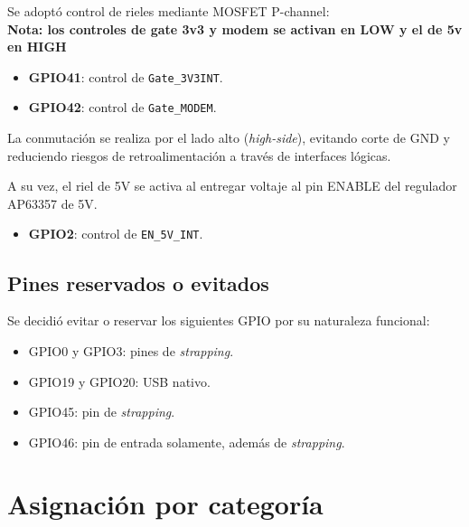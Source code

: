 \documentclass[9pt,a4paper,twocolumn,twoside]{rho-class/rho}
\begin{document}
Se adoptó control de rieles mediante MOSFET P-channel:\\
\textbf{Nota: los controles de gate 3v3 y modem se activan en LOW y el de 5v en HIGH}
\begin{itemize}
    \item \textbf{GPIO41}: control de \texttt{Gate\_3V3INT}.
    \item \textbf{GPIO42}: control de \texttt{Gate\_MODEM}.
\end{itemize}

La conmutación se realiza por el lado alto (\textit{high-side}), evitando corte de GND y reduciendo riesgos de retroalimentación a través de interfaces lógicas.

A su vez, el riel de 5V se activa al entregar voltaje al pin ENABLE del regulador AP63357 de 5V.
\begin{itemize}
    \item \textbf{GPIO2}: control de \texttt{EN\_5V\_INT}.
\end{itemize}


\subsection{Pines reservados o evitados}

Se decidió evitar o reservar los siguientes GPIO por su naturaleza funcional:

\begin{itemize}
    \item GPIO0 y GPIO3: pines de \textit{strapping}.
    \item GPIO19 y GPIO20: USB nativo.
    \item GPIO45: pin de \textit{strapping}.
    \item GPIO46: pin de entrada solamente, además de \textit{strapping}.
\end{itemize}




\newpage

\section{Asignación por categoría}
\end{document}
